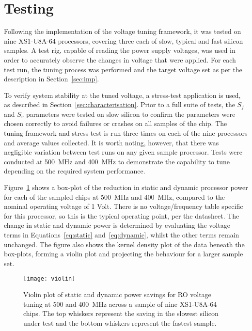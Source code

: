 \documentclass[a4paper,twocolumn,DIV=16]{scrartcl}
\begin{document}
\section{Testing}
\label{sec:test}

Following the implementation of the voltage tuning framework, it was tested on
nine XS1-U8A-64 processors, covering three each of slow, typical and fast
silicon samples. A test rig, capable of reading the power supply voltages, was
used in order to accurately observe the changes in voltage that were applied.
For each test run, the tuning process was performed and the target voltage set
as per the description in Section~\ref{sec:imp}.

To verify system stability at the tuned voltage, a stress-test application is
used, as described in Section~\ref{sec:characterisation}. Prior to a full suite
of tests, the $S_f$ and $S_v$ parameters were tested on slow silicon to confirm
the parameters were chosen correctly to avoid failures or crashes on all samples
of the chip. The tuning framework and stress-test is run three times on each of
the nine processors and average values collected. It is worth noting, however,
that there was negligible variation between test runs on any given sample
processor. Tests were conducted at 500~MHz and 400~MHz to demonstrate the
capability to tune depending on the required system performance.

Figure~\ref{fig:savings} shows a box-plot of the reduction in static and dynamic
processor power for each of the sampled chips at 500~MHz and 400~MHz, compared
to the nominal operating voltage of 1 Volt. There is no voltage/frequency table
specific for this processor, so this is the typical operating point, per the
datasheet. The change in static and dynamic power is determined by evaluating
the voltage terms in Equations~\ref{eq:static} and~\ref{eq:dynamic}, whilst the
other terms remain unchanged. The figure also shows the kernel density plot of
the data beneath the box-plots, forming a violin plot and projecting the
behaviour for a larger sample set.

\begin{figure}
\centerline{\texttt{[image: violin]}}
\caption{Violin plot of static and dynamic power savings for RO voltage tuning
at 500 and 400~MHz across a sample of nine XS1-U8A-64 chips. The top whiskers
represent the saving in the slowest silicon under test and the bottom whiskers
represent the fastest sample.}
\label{fig:savings}
\end{figure}
\end{document}
